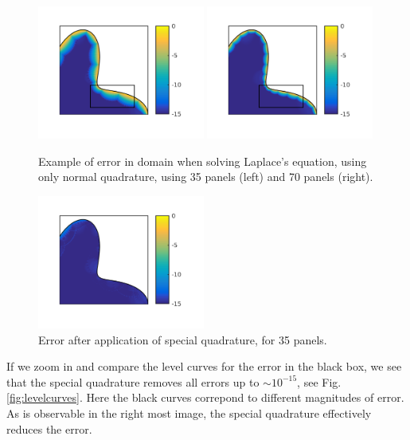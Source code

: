 \documentclass[a4paper,10pt]{article}
\begin{document}
\begin{figure}[ht]
    \begin{center}
        \includegraphics[width=0.49\textwidth]{Graphics/filled_error_panels35.png}
        \includegraphics[width =0.49\textwidth]{Graphics/filled_error_panels70.png}
    \end{center}
    \caption{Example of error in domain when solving Laplace's equation, using only normal quadrature, using 35 panels (left) and 70 panels (right).}
    \label{fig:normquad}
\end{figure}
\begin{figure}[ht]
    \begin{center}
        \includegraphics[width=0.49\textwidth]{Graphics/fillederror_SQ_panels35.png}
        \end{center}
    \caption{Error after application of special quadrature, for 35 panels.}
    \label{fig:specquad}
\end{figure}
If we zoom in and compare the level curves for the error in the black box, we see that the special quadrature removes all errors up to $\sim 10^{-15}$, see Fig. \ref{fig:levelcurves}. Here the black curves correpond to different magnitudes of error. As is observable in the right most image, the special quadrature effectively reduces the error.
\end{document}
